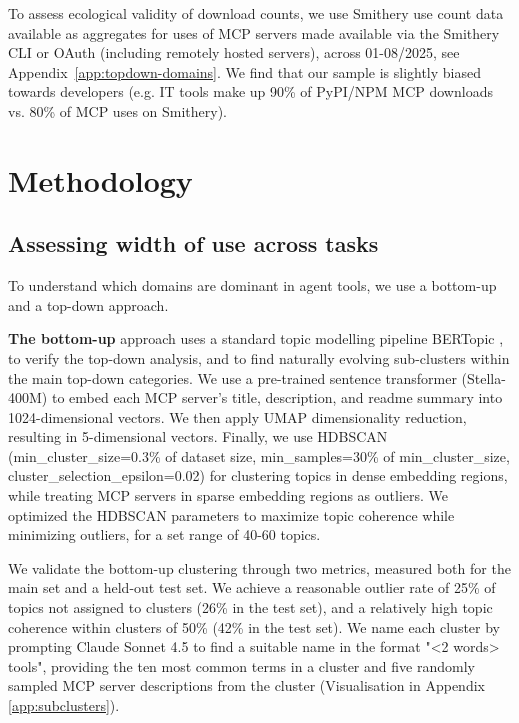 \documentclass[manuscript,screen,nonacm,oneside]{acmart}
\begin{document}
To assess ecological validity of download counts, we use Smithery use count data available as aggregates for uses of MCP servers made available via the Smithery CLI or OAuth (including remotely hosted servers), across 01-08/2025, see Appendix~\ref{app:topdown-domains}. We find that our sample is slightly biased towards developers (e.g. IT tools make up 90\% of PyPI/NPM MCP downloads vs. 80\% of MCP uses on Smithery).

\section{Methodology}
\label{sec:methodology}

\subsection{Assessing width of use across tasks}
\label{sec:topic-modelling}

To understand which domains are dominant in agent tools, we use a bottom-up and a top-down approach. 

\textbf{The bottom-up} approach uses a standard topic modelling pipeline BERTopic \citep{grootendorst2022bertopic}, to verify the top-down analysis, and to find naturally evolving sub-clusters within the main top-down categories. 
We use a pre-trained sentence transformer (Stella-400M) to embed each MCP server's title, description, and readme summary into 1024-dimensional vectors. We then apply UMAP dimensionality reduction, resulting in 5-dimensional vectors. Finally, we use HDBSCAN (min\_cluster\_size=0.3\% of dataset size, min\_samples=30\% of min\_cluster\_size, cluster\_selection\_epsilon=0.02) for clustering topics in dense embedding regions, while treating MCP servers in sparse embedding regions as outliers. We optimized the HDBSCAN parameters to maximize topic coherence while minimizing outliers, for a set range of 40-60 topics.

We validate the bottom-up clustering through two metrics, measured both for the main set and a held-out test set. We achieve a reasonable outlier rate of 25\% of topics not assigned to clusters (26\% in the test set), and a relatively high topic coherence \citep{roder2015exploring} within clusters of 50\% (42\% in the test set). We name each cluster by prompting Claude Sonnet 4.5 to find a suitable name in the format "\textless2 words\textgreater{} tools", providing the ten most common terms in a cluster and five randomly sampled MCP server descriptions from the cluster (Visualisation in Appendix \ref{app:subclusters}).
\end{document}

